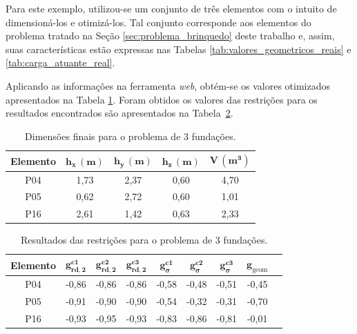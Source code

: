 Para este exemplo, utilizou-se um conjunto de três elementos com o intuito de dimensioná-los e otimizá-los. Tal conjunto corresponde aos elementos do problema tratado na Seção \ref{sec:problema_brinquedo} deste trabalho e, assim, suas características estão expressas nas Tabelas \ref{tab:valores_geometricos_reais} e \ref{tab:carga_atuante_real}.


Aplicando as informações na ferramenta \textit{web}, obtém-se os valores otimizados apresentados na Tabela \ref{tab:dimensoes_3_fundacoes}. Foram obtidos os valores das restrições para os resultados encontrados são apresentados na Tabela~\ref{tab:resultado_g_3_fundacoes}.


\begin{table}[H]
\centering
\caption{Dimensões finais para o problema de 3 fundações.}
\label{tab:dimensoes_3_fundacoes}
\begin{tabular}{ccccc}
\toprule
\textbf{Elemento} &
$\mathbf{h_x\,(m)}$ &
$\mathbf{h_y\,(m)}$ &
$\mathbf{h_z\,(m)}$ &
$\mathbf{V\,(m^3)}$\\
\midrule
P04 & 1,73 & 2,37 & 0,60 & 4,70\\
P05 & 0,62 & 2,72 & 0,60 & 1,01\\
P16 & 2,61 & 1,42 & 0,63 & 2,33\\
\bottomrule
\end{tabular}
\end{table}


\begin{table}[H]
\centering
\caption{Resultados das restrições para o problema de 3 fundações.}
\label{tab:resultado_g_3_fundacoes}
\begin{tabular}{ccccccccc}
\toprule
\textbf{Elemento} &
$\mathbf{g_{rd,2}^{c1}}$ &
$\mathbf{g_{rd,2}^{c2}}$ &
$\mathbf{g_{rd,2}^{c3}}$ &
$\mathbf{g_{\sigma}^{c1}}$ &
$\mathbf{g_{\sigma}^{c2}}$ &
$\mathbf{g_{\sigma}^{c3}}$ &
$\mathbf{g_{\mathrm{geom}}}$ \\
\midrule
P04 & -0,86 & -0,86 & -0,86 & -0,58 & -0,48 & -0,51 &  -0,45 \\
P05 & -0,91 & -0,90 & -0,90 & -0,54 & -0,32 & -0,31 &  -0,70 \\
P16  & -0,93 & -0,95 & -0,93 & -0,83 & -0,86 & -0,81 &  -0,01 \\
\bottomrule
\end{tabular}
\end{table}

